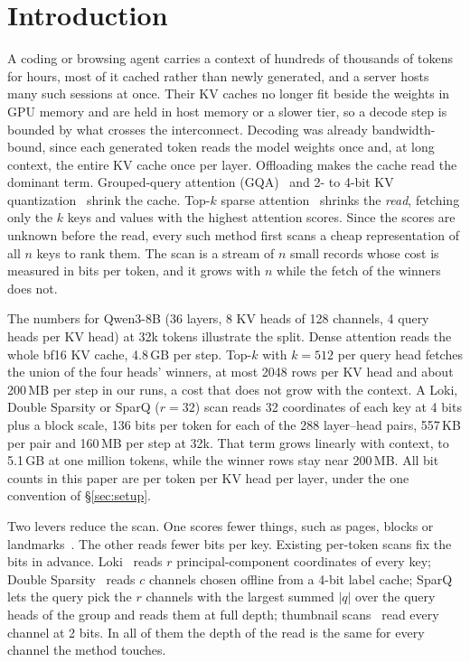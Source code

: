 \documentclass[10pt,twocolumn]{article}
\begin{document}
\section{Introduction}
A coding or browsing agent carries a context of hundreds of thousands of tokens for hours, most of it cached rather than newly generated, and a server hosts many such sessions at once. Their KV caches no longer fit beside the weights in GPU memory and are held in host memory or a slower tier, so a decode step is bounded by what crosses the interconnect. Decoding was already bandwidth-bound, since each generated token reads the model weights once and, at long context, the entire KV cache once per layer. Offloading makes the cache read the dominant term. Grouped-query attention (GQA)~\cite{gqa} and 2- to 4-bit KV quantization~\cite{kivi,kvquant} shrink the cache. Top-$k$ sparse attention~\cite{loki,doublesparsity,sparq,quest} shrinks the \emph{read}, fetching only the $k$ keys and values with the highest attention scores. Since the scores are unknown before the read, every such method first scans a cheap representation of all $n$ keys to rank them. The scan is a stream of $n$ small records whose cost is measured in bits per token, and it grows with $n$ while the fetch of the winners does not.

The numbers for Qwen3-8B (36 layers, 8 KV heads of 128 channels, 4 query heads per KV head) at 32k tokens illustrate the split. Dense attention reads the whole bf16 KV cache, 4.8\,GB per step. Top-$k$ with $k=512$ per query head fetches the union of the four heads' winners, at most 2048 rows per KV head and about 200\,MB per step in our runs, a cost that does not grow with the context. A Loki, Double Sparsity or SparQ ($r=32$) scan reads 32 coordinates of each key at 4 bits plus a block scale, 136 bits per token for each of the 288 layer--head pairs, 557\,KB per pair and 160\,MB per step at 32k. That term grows linearly with context, to 5.1\,GB at one million tokens, while the winner rows stay near 200\,MB. All bit counts in this paper are per token per KV head per layer, under the one convention of \S\ref{sec:setup}.

Two levers reduce the scan. One scores fewer things, such as pages, blocks or landmarks~\cite{quest,infllm,shadowkv}. The other reads fewer bits per key. Existing per-token scans fix the bits in advance. Loki~\cite{loki} reads $r$ principal-component coordinates of every key; Double Sparsity~\cite{doublesparsity} reads $c$ channels chosen offline from a 4-bit label cache; SparQ~\cite{sparq} lets the query pick the $r$ channels with the largest summed $|q|$ over the query heads of the group and reads them at full depth; thumbnail scans~\cite{ffd} read every channel at 2 bits. In all of them the depth of the read is the same for every channel the method touches.
\end{document}
